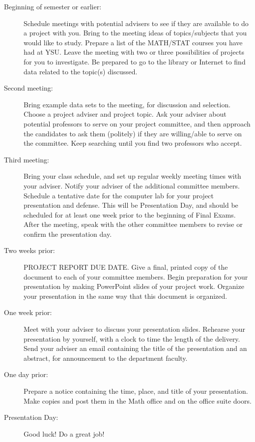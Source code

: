 \documentclass[11pt]{article}
\begin{document}
\begin{description}
\item[Beginning of semester or earlier:] Schedule meetings with
potential advisers to see if they are available to do a project
with you. Bring to the meeting ideas of topics/subjects that you
would like to study. Prepare a list of the MATH/STAT courses you
have had at YSU. Leave the meeting with two or three
possibilities of projects for you to investigate. Be prepared to
go to the library or Internet to find data related to the
topic(s) discussed.
\item[Second meeting:] Bring example data sets to the meeting, for
discussion and selection. Choose a project adviser and project
topic. Ask your adviser about potential professors to serve on
your project committee, and then approach the candidates to ask
them (politely) if they are willing/able to serve on the
committee. Keep searching until you find two professors who
accept.

\item[Third meeting:] Bring your class schedule, and set up regular
weekly meeting times with your adviser. Notify
your adviser of the additional committee
members. Schedule a tentative date for the
computer lab for your project presentation and
defense.  This will be Presentation Day, and
should be scheduled for at least one week prior to
the beginning of Final Exams. After the meeting,
speak with the other committee members to revise
or confirm the presentation day.
\item[Two weeks prior:] PROJECT REPORT DUE DATE. Give a final, printed
copy of the document to each of your committee members. Begin
preparation for your presentation by making PowerPoint slides of
your project work. Organize your presentation in the same way
that this document is organized.

\item[One week prior:] Meet with your adviser to discuss your
presentation slides. Rehearse your presentation by yourself, with
a clock to time the length of the delivery. Send your adviser an
email containing the title of the presentation and an abstract,
for announcement to the department faculty.

\item[One day prior:] Prepare a notice containing the time, place, and
title of your presentation. Make copies and post
them in the Math office and on the office suite
doors.

\item[Presentation Day:] Good luck! Do a great job!


\end{description}
\end{document}
